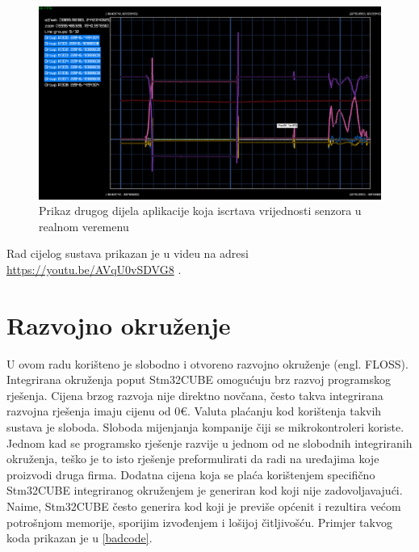 \documentclass[times, utf8, diplomski]{diplomski}
\begin{document}
\begin{figure}[H]
\includegraphics[width=\textwidth]{rlplot_allsensors_20230623_120537.png}
\centering
\caption{Prikaz drugog dijela aplikacije koja iscrtava vrijednosti senzora u realnom veremenu}
\label{fig:wireshark}
\end{figure}

Rad cijelog sustava prikazan je u videu na adresi \url{https://youtu.be/AVqU0vSDVG8} \cite{videodemo}.

\newpage

\chapter{Razvojno okruženje}
U ovom radu korišteno je slobodno i otvoreno razvojno okruženje (engl. FLOSS\cite{FLOSS}). Integrirana okruženja poput Stm32CUBE omogućuju brz razvoj programskog rješenja. Cijena brzog razvoja nije direktno novčana, često takva integrirana razvojna rješenja imaju cijenu od 0€. Valuta plaćanju kod korištenja takvih sustava je sloboda. Sloboda mijenjanja kompanije čiji se mikrokontroleri koriste. Jednom kad se programsko rješenje razvije u jednom od ne slobodnih integriranih okruženja, teško je to isto rješenje preformulirati da radi na uređajima koje proizvodi druga firma\cite{VENDORLOCKIN}. Dodatna cijena koja se plaća korištenjem specifično Stm32CUBE integriranog okruženjem je generiran kod koji nije zadovoljavajući. Naime, Stm32CUBE često generira kod koji je previše općenit i rezultira većom potrošnjom memorije, sporijim izvođenjem i lošijoj čitljivošću. Primjer takvog koda prikazan je u \ref{badcode}.


\end{document}
